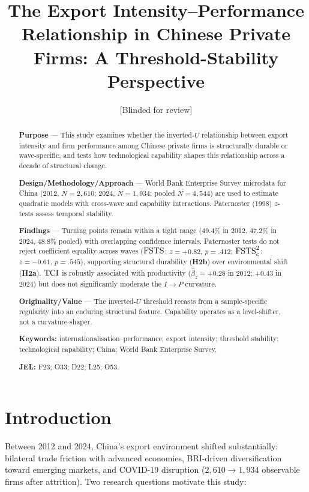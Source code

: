 \documentclass[12pt,a4paper]{article}
\title{The Export Intensity--Performance Relationship in Chinese Private Firms:
  A Threshold-Stability Perspective}
\author{[Blinded for review]}
\date{}
\begin{document}
\maketitle

\begin{abstract}
\noindent\textbf{Purpose} --- This study examines whether the inverted-\(U\)
relationship between export intensity and firm performance among Chinese
private firms is structurally durable or wave-specific, and tests how
technological capability shapes this relationship across a decade of structural
change.

\medskip
\noindent\textbf{Design/Methodology/Approach} --- World Bank Enterprise Survey
microdata for China (2012, \(N = 2{,}610\); 2024, \(N = 1{,}934\); pooled
\(N = 4{,}544\)) are used to estimate quadratic models with cross-wave and
capability interactions.  Paternoster (1998) \(z\)-tests assess temporal
stability.

\medskip
\noindent\textbf{Findings} --- Turning points remain within a tight range
(49.4\% in 2012, 47.2\% in 2024, 48.8\% pooled) with overlapping confidence
intervals.  Paternoster tests do not reject coefficient equality across waves
(\({\mathrm{FSTS}}\): \(z = +0.82\), \(p = .412\); \({\mathrm{FSTS}_{c}^{2}}\): \(z = -0.61\),
\(p = .545\)), supporting structural durability (\textbf{H2b}) over
environmental shift (\textbf{H2a}).  \({\mathrm{TCI}}\) is robustly associated with
productivity (\(\hat{\beta}_{z} = +0.28\) in 2012; \(+0.43\) in 2024) but
does not significantly moderate the \(I \to P\) curvature.

\medskip
\noindent\textbf{Originality/Value} --- The inverted-\(U\) threshold recasts
from a sample-specific regularity into an enduring structural feature.
Capability operates as a level-shifter, not a curvature-shaper.

\medskip
\noindent\textbf{Keywords:} internationalisation--performance; export
intensity; threshold stability; technological capability; China; World Bank
Enterprise Survey.

\medskip
\noindent\textbf{JEL:} F23; O33; D22; L25; O53.
\end{abstract}

\newpage

\section{Introduction}
\label{sec:intro}

Between 2012 and 2024, China's export environment shifted substantially:
bilateral trade friction with advanced economies, BRI-driven diversification
toward emerging markets, and COVID-19 disruption (\(2{,}610 \to 1{,}934\)
observable firms after attrition).  Two research questions motivate this study:
\end{document}
